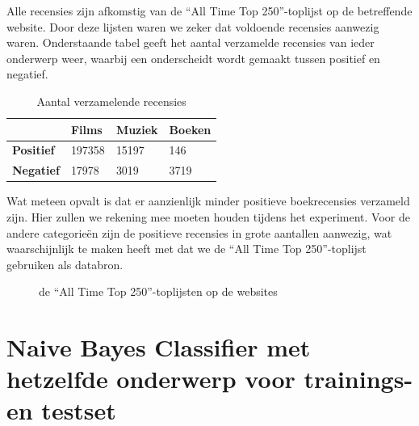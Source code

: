  Alle recensies zijn afkomstig van de ``All Time Top 250''-toplijst op de betreffende website. Door deze lijsten waren we zeker dat voldoende recensies aanwezig waren. Onderstaande tabel geeft het aantal verzamelde recensies van ieder onderwerp weer, waarbij een onderscheidt wordt gemaakt tussen positief en negatief.

\begin{table}[h]
\centering
\begin{tabular}{l|l|l|l|}
\cline{2-4}
                                        & \textbf{Films} & \textbf{Muziek} & \textbf{Boeken} \\ \hline
\multicolumn{1}{|l|}{\textbf{Positief}} & 197358         & 15197           & 146             \\ \hline
\multicolumn{1}{|l|}{\textbf{Negatief}} & 17978          & 3019            & 3719            \\ \hline
\end{tabular}
\caption{Aantal verzamelende recensies} 
\end{table}

Wat meteen opvalt is dat er aanzienlijk minder positieve boekrecensies verzameld zijn. Hier zullen we rekening mee moeten houden tijdens het experiment. Voor de andere categorie\"en zijn de positieve recensies in grote aantallen aanwezig, wat waarschijnlijk te maken heeft met dat we de ``All Time Top 250''-toplijst gebruiken als databron.

\begin{figure}%
    \centering
    \caption{de ``All Time Top 250''-toplijsten op de websites}%
\end{figure}

\section{Naive Bayes Classifier met hetzelfde onderwerp voor trainings- en testset}\label{Naive Bayes Classifier met hetzelfde onderwerp voor trainings- en testset}

